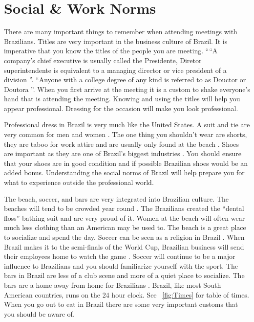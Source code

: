 \documentclass[11pt,a4paper,twoside]{report}
\begin{document}
\section{Social \& Work Norms}

There are many important things to remember when attending meetings with
Brazilians. Titles are very important in the business culture of Brazil. It
is imperative that you know the titles of the people you are meeting. ““A
company’s chief executive is usually called the Presidente, Diretor
superintendente is equivalent to a managing director or vice president of a
division \citep*[pg. 75]{herrington}”.  “Anyone with a college degree of any kind
is referred to as Douctor or Doutora \citep*[pg. 75]{herrington}”. When you first
arrive at the meeting it is a custom to shake everyone’s hand that is
attending the meeting. Knowing and using the titles will help you appear
professional. Dressing for the occasion will make you look professional.

Professional dress in Brazil is very much like the United States. A suit and
tie are very common for men and women \citep*[pg. 81]{herrington}. The one thing you
shouldn’t wear are shorts, they are taboo for work attire and are usually only
found at the beach \citep*[pg. 81]{herrington}. Shoes are important as they are one of
Brazil’s biggest industries \citep*{brazilCIA}.
You should ensure that your shoes are in good condition and if possible
Brazilian shoes would be an added bonus. Understanding the social norms of
Brazil will help prepare you for what to experience outside the professional
world.

The beach, soccer, and bars are very integrated into Brazilian culture. The
beaches will tend to be crowded year round \citep*[pg. 86]{herrington}. The Brazilians
created the “dental floss” bathing suit and are very proud of it. Women at the
beach will often wear much less clothing than an American may be used to. The
beach is a great place to socialize and spend the day.  Soccer can be seen as a
religion in Brazil \citep*[pg. 87]{herrington}. When Brazil makes it to the semi-finals
of the World Cup, Brazilian business will send their employees home to watch
the game \citep*[pg. 87]{herrington}. Soccer will continue to be a major influence to
Brazilians and you should familiarize yourself with the sport. The bars in
Brazil are less of a club scene and more of a quiet place to socialize. The
bars are a home away from home for Brazilians \citep*[pg. 87]{herrington}. Brazil, like
most South American countries, runs on the 24 hour clock. See ~\ref{fig:Times} for
table of times.  When you go out to eat in Brazil there are some very important
customs that you should be aware of.
\end{document}
